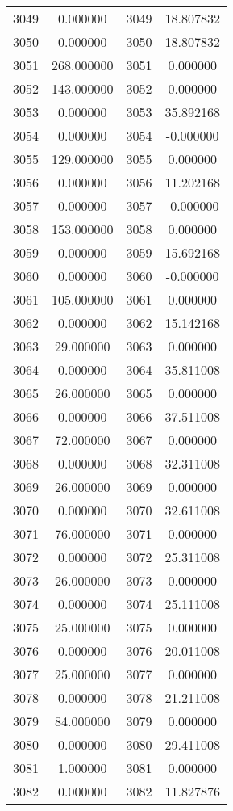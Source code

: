 \documentclass[12pt]{article}
\begin{document}
\begin{longtable}{@{}cccc@{}}
3049 & 0.000000 & 3049 & 18.807832 \\
3050 & 0.000000 & 3050 & 18.807832 \\
3051 & 268.000000 & 3051 & 0.000000 \\
3052 & 143.000000 & 3052 & 0.000000 \\
3053 & 0.000000 & 3053 & 35.892168 \\
3054 & 0.000000 & 3054 & -0.000000 \\
3055 & 129.000000 & 3055 & 0.000000 \\
3056 & 0.000000 & 3056 & 11.202168 \\
3057 & 0.000000 & 3057 & -0.000000 \\
3058 & 153.000000 & 3058 & 0.000000 \\
3059 & 0.000000 & 3059 & 15.692168 \\
3060 & 0.000000 & 3060 & -0.000000 \\
3061 & 105.000000 & 3061 & 0.000000 \\
3062 & 0.000000 & 3062 & 15.142168 \\
3063 & 29.000000 & 3063 & 0.000000 \\
3064 & 0.000000 & 3064 & 35.811008 \\
3065 & 26.000000 & 3065 & 0.000000 \\
3066 & 0.000000 & 3066 & 37.511008 \\
3067 & 72.000000 & 3067 & 0.000000 \\
3068 & 0.000000 & 3068 & 32.311008 \\
3069 & 26.000000 & 3069 & 0.000000 \\
3070 & 0.000000 & 3070 & 32.611008 \\
3071 & 76.000000 & 3071 & 0.000000 \\
3072 & 0.000000 & 3072 & 25.311008 \\
3073 & 26.000000 & 3073 & 0.000000 \\
3074 & 0.000000 & 3074 & 25.111008 \\
3075 & 25.000000 & 3075 & 0.000000 \\
3076 & 0.000000 & 3076 & 20.011008 \\
3077 & 25.000000 & 3077 & 0.000000 \\
3078 & 0.000000 & 3078 & 21.211008 \\
3079 & 84.000000 & 3079 & 0.000000 \\
3080 & 0.000000 & 3080 & 29.411008 \\
3081 & 1.000000 & 3081 & 0.000000 \\
3082 & 0.000000 & 3082 & 11.827876 \\

\end{longtable}
\end{document}

